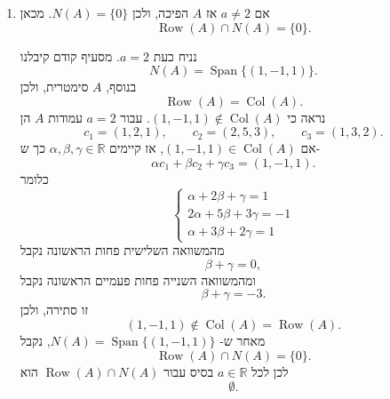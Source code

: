 \documentclass[12pt, a4paper]{article}
\newcommand{\rr}{\mathbb{R}}
\DeclareMathOperator{\Span}{Span}
\DeclareMathOperator{\row}{Row}
\DeclareMathOperator{\col}{Col}
\begin{document}
\begin{enumerate}
\begin{enumerate}
נניח כעת
$a=2$.
אז
$$
A=
\begin{pmatrix}
1&2&1\\
2&5&3\\
1&3&2
\end{pmatrix}.
$$
נדרג:
$$
\begin{pmatrix}
1&2&1\\
2&5&3\\
1&3&2
\end{pmatrix}
\longrightarrow
\begin{pmatrix}
1&2&1\\
0&1&1\\
0&1&1
\end{pmatrix}
\longrightarrow
\begin{pmatrix}
1&2&1\\
0&1&1\\
0&0&0
\end{pmatrix}
\longrightarrow
\begin{pmatrix}
1&0&-1\\
0&1&1\\
0&0&0
\end{pmatrix}.
$$
לכן בסיס עבור מרחב השורות הוא
$$
\boxed{
\row(A)=\Span\{(1,0,-1),(0,1,1)\}
}.
$$
העמודות המובילות הן העמודות הראשונה והשנייה, ולכן בסיס עבור מרחב העמודות הוא
$$
\boxed{
\col(A)=\Span\{(1,2,1),(2,5,3)\}
}.
$$
כדי למצוא את הגרעין נפתור
$$
x-z=0,
\qquad
y+z=0.
$$
לכן
$$
(x,y,z)=(t,-t,t)=t(1,-1,1),
$$
ומקבלים
$$
\boxed{
N(A)=\Span\{(1,-1,1)\}
}.
$$

\item
אם
$a\neq 2$
אז
$A$
הפיכה, ולכן
$N(A)=\{0\}$.
מכאן
$$
\row(A)\cap N(A)=\{0\}.
$$

נניח כעת
$a=2$.
מסעיף קודם קיבלנו
$$
N(A)=\Span\{(1,-1,1)\}.
$$
בנוסף,
$A$
סימטרית, ולכן
$$
\row(A)=\col(A).
$$
נראה כי
$(1,-1,1)\notin\col(A)$.
עבור
$a=2$
עמודות
$A$
הן
$$
c_1=(1,2,1),
\qquad
c_2=(2,5,3),
\qquad
c_3=(1,3,2).
$$
אם
$(1,-1,1)\in\col(A)$,
אז קיימים
$\alpha,\beta,\gamma\in\rr$
כך ש-
$$
\alpha c_1+\beta c_2+\gamma c_3=(1,-1,1).
$$
כלומר
$$
\begin{cases}
\alpha+2\beta+\gamma=1\\
2\alpha+5\beta+3\gamma=-1\\
\alpha+3\beta+2\gamma=1
\end{cases}
$$
מהמשוואה השלישית פחות הראשונה נקבל
$$
\beta+\gamma=0,
$$
ומהמשוואה השנייה פחות פעמיים הראשונה נקבל
$$
\beta+\gamma=-3.
$$
זו סתירה, ולכן
$$
(1,-1,1)\notin\col(A)=\row(A).
$$
מאחר ש-
$N(A)=\Span\{(1,-1,1)\}$,
נקבל
$$
\row(A)\cap N(A)=\{0\}.
$$
לכן לכל
$a\in\rr$
בסיס עבור
$\row(A)\cap N(A)$
הוא
$$
\boxed{\emptyset}.
$$


\end{enumerate}
\end{enumerate}
\end{document}
